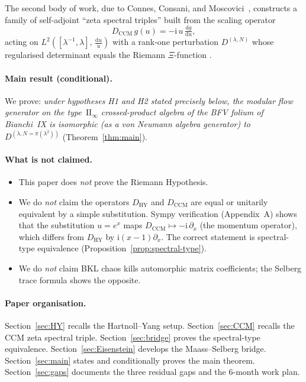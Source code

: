 \documentclass[11pt]{article}
\newcommand{\HY}{\mathrm{HY}}
\newcommand{\CCM}{\mathrm{CCM}}
\newcommand{\dd}{\mathrm{d}}
\newcommand{\ii}{\mathrm{i}}
\newcommand{\Lam}{\lambda}
\newcommand{\II}{\mathrm{II}_\infty}
\begin{document}
The second body of work, due to Connes, Consani, and
Moscovici~\cite{CCM2025}, constructs a family of self-adjoint
``zeta spectral triples'' built from the scaling operator
\begin{equation}
  D_\CCM\, g(u) = -\ii\, u\,\tfrac{\dd g}{\dd u},
  \label{eq:DCCM-def}
\end{equation}
acting on $L^2\!\left([\Lam^{-1},\Lam],\, \frac{\dd u}{u}\right)$
with a rank-one perturbation $D^{(\Lam,N)}$ whose regularised
determinant equals the Riemann $\Xi$-function \cite[Thm.~1.1]{CCM2025}.

\paragraph{Main result (conditional).}
We prove: \emph{under hypotheses H1 and H2 stated precisely below, the
modular flow generator on the type~$\II$ crossed-product algebra of the
BFV folium of Bianchi~IX is isomorphic (as a von Neumann algebra
generator) to $D^{(\Lam,N=\pi(\Lam^2))}$} (Theorem~\ref{thm:main}).

\paragraph{What is not claimed.}
\begin{itemize}
\item This paper does \emph{not} prove the Riemann Hypothesis.
\item We do \emph{not} claim the operators $D_\HY$ and $D_\CCM$ are
  equal or unitarily equivalent by a simple substitution. Sympy
  verification (Appendix~A) shows that the substitution $u = e^x$
  maps $D_\CCM \mapsto -\ii\,\partial_x$ (the momentum operator), which
  differs from $D_\HY$ by $\ii(x-1)\partial_x$. The correct statement
  is spectral-type equivalence (Proposition~\ref{prop:spectral-type}).
\item We do \emph{not} claim BKL chaos kills automorphic matrix
  coefficients; the Selberg trace formula shows the opposite.
\end{itemize}

\paragraph{Paper organisation.}
Section~\ref{sec:HY} recalls the Hartnoll--Yang setup.
Section~\ref{sec:CCM} recalls the CCM zeta spectral triple.
Section~\ref{sec:bridge} proves the spectral-type equivalence.
Section~\ref{sec:Eisenstein} develops the Maass--Selberg bridge.
Section~\ref{sec:main} states and conditionally proves the main theorem.
Section~\ref{sec:gaps} documents the three residual gaps and the 6-month
work plan.
\end{document}
